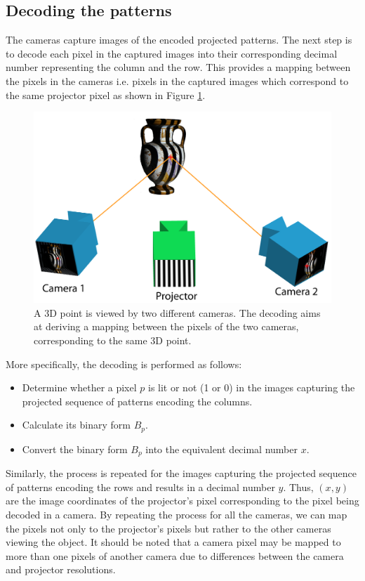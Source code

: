 \documentclass[final,12pt,3p]{elsarticle}
\begin{document}
\subsection{Decoding the patterns}
\label{subsec:decoding_patterns}

The cameras capture images of the encoded projected patterns. The next step is to decode each pixel in the captured images into their corresponding decimal number representing the column and the row. This provides a mapping between the pixels in the cameras i.e. pixels in the captured images which correspond to the same projector pixel as shown in Figure \ref{fig:decoding}.

\begin{figure}[!ht]
 \centering
 \includegraphics[scale=0.9]{./images/slsDiagram.png}
 \caption{\label{fig:decoding} A 3D point is viewed by two different cameras. The decoding aims at deriving a mapping between the pixels of the two cameras, corresponding to the same 3D point.}
\end{figure}

More specifically, the decoding is performed as follows: 
\begin{itemize}
	\item Determine whether a pixel $p$ is lit or not (1 or 0) in the images capturing the projected sequence of patterns encoding the columns.
	\item Calculate its binary form $B_{p}$.
	\item Convert the binary form $B_{p}$ into the equivalent decimal number $x$.
\end{itemize}
Similarly, the process is repeated for the images capturing the projected sequence of patterns encoding the rows and results in a decimal number $y$. Thus, $(x,y)$ are the image coordinates of the projector's pixel corresponding to the pixel being decoded in a camera. By repeating the process for all the cameras, we can map the pixels not only to the projector's pixels but rather to the other cameras viewing the object. It should be noted that a camera pixel may be mapped to more than one pixels of another camera due to differences between the camera and projector resolutions.
\end{document}
